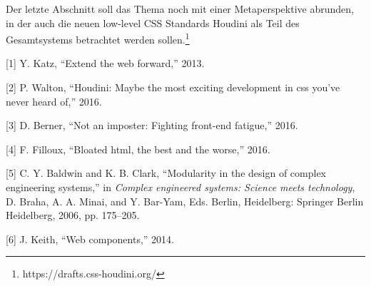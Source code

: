 Der letzte Abschnitt soll das Thema noch mit einer Metaperspektive
abrunden, in der auch die neuen low-level CSS Standards Houdini als Teil
des Gesamtsystems betrachtet werden sollen.\footnote{https://drafts.css-houdini.org/}

\hypertarget{refs}{}
\hypertarget{ref-Katz2013}{}
{[}1{]} Y. Katz, ``Extend the web forward,'' 2013.

\hypertarget{ref-Walton2016}{}
{[}2{]} P. Walton, ``Houdini: Maybe the most exciting development in css
you've never heard of,'' 2016.

\hypertarget{ref-Berner2016}{}
{[}3{]} D. Berner, ``Not an imposter: Fighting front-end fatigue,''
2016.

\hypertarget{ref-Filloux2016}{}
{[}4{]} F. Filloux, ``Bloated html, the best and the worse,'' 2016.

\hypertarget{ref-Baldwin2006}{}
{[}5{]} C. Y. Baldwin and K. B. Clark, ``Modularity in the design of
complex engineering systems,'' in \emph{Complex engineered systems:
Science meets technology}, D. Braha, A. A. Minai, and Y. Bar-Yam, Eds.
Berlin, Heidelberg: Springer Berlin Heidelberg, 2006, pp. 175--205.

\hypertarget{ref-Keith2014}{}
{[}6{]} J. Keith, ``Web components,'' 2014.
